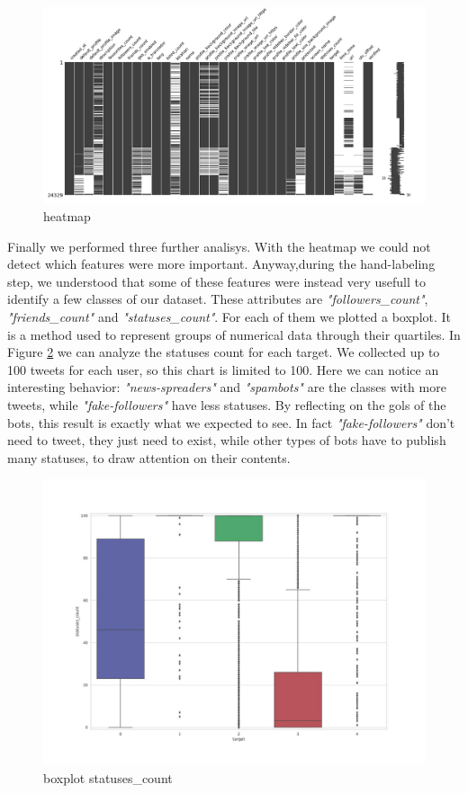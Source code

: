 \begin{figure}
	\centering
	\includegraphics[width=\columnwidth]{chapter3/figure/msno.png}
	\caption{heatmap}
	\label{fig:msno}
\end{figure}

\newpage
Finally we performed three further analisys. With the heatmap we could not detect which features were more important. Anyway,during the hand-labeling step, we understood that some of these features were instead very usefull to identify a few classes of our dataset. These attributes are \emph{"followers\_count"}, \emph{"friends\_count"} and \emph{"statuses\_count"}. For each of them we plotted a boxplot. It is a method used to represent groups of numerical data through their quartiles. In Figure \ref{fig:box_statuses} we can analyze the statuses count for each target. We collected up to 100 tweets for each user, so this chart is limited to 100. Here we can notice an interesting behavior: \emph{"news-spreaders"} and \emph{"spambots"} are the classes with more tweets, while \emph{"fake-followers"} have less statuses. By reflecting on the gols of the bots, this result is exactly what we expected to see. In fact \emph{"fake-followers"} don't need to tweet, they just need to exist, while other types of bots have to publish many statuses, to draw attention on their contents.

\begin{figure}
	\centering
	\includegraphics[width=\columnwidth]{chapter3/figure/boxplot_statuses.jpg}
	\caption{boxplot statuses\_count}
	\label{fig:box_statuses}
\end{figure}
\newpage

